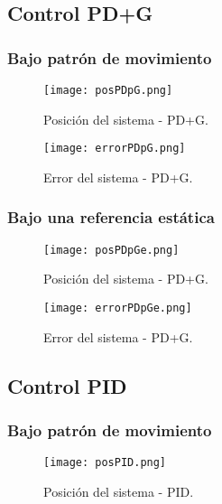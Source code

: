 \subsection{Control PD+G}

\subsubsection{Bajo patrón de movimiento}

\begin{figure}[htb]
    \centering
    \texttt{[image: posPDpG.png]}
    \caption{Posición del sistema - PD+G.}
    \label{fig:PDG position}
\end{figure}

\begin{figure}[htb]
    \centering
    \texttt{[image: errorPDpG.png]}
    \caption{Error del sistema - PD+G.}
    \label{fig:PDG error}
\end{figure}

\subsubsection{Bajo una referencia estática}

\begin{figure}[htb]
    \centering
    \texttt{[image: posPDpGe.png]}
    \caption{Posición del sistema - PD+G.}
    \label{fig:PDG position}
\end{figure}

\begin{figure}[htb]
    \centering
    \texttt{[image: errorPDpGe.png]}
    \caption{Error del sistema - PD+G.}
    \label{fig:PDG error}
\end{figure}


\subsection{Control PID}

\subsubsection{Bajo patrón de movimiento}

\begin{figure}[htb]
    \centering
    \texttt{[image: posPID.png]}
    \caption{Posición del sistema - PID.}
    \label{fig:PID position}
\end{figure}

